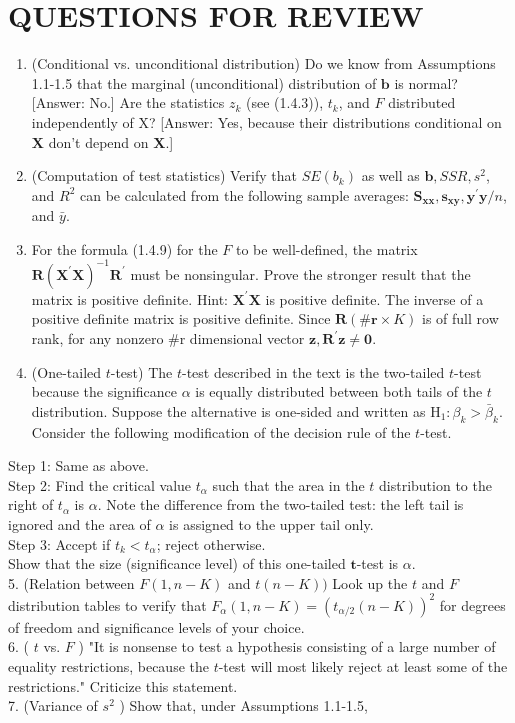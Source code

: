 \documentclass[10pt]{article}
\begin{document}
\section*{QUESTIONS FOR REVIEW}
\begin{enumerate}
  \item (Conditional vs. unconditional distribution) Do we know from Assumptions 1.1-1.5 that the marginal (unconditional) distribution of $\mathbf{b}$ is normal? [Answer: No.] Are the statistics $z_{k}$ (see (1.4.3)), $t_{k}$, and $F$ distributed independently of X? [Answer: Yes, because their distributions conditional on $\mathbf{X}$ don't depend on $\mathbf{X}$.]
  \item (Computation of test statistics) Verify that $S E\left(b_{k}\right)$ as well as $\mathbf{b}, S S R, s^{2}$, and $R^{2}$ can be calculated from the following sample averages: $\mathbf{S}_{\mathbf{x x}}, \mathbf{s}_{\mathbf{x y}}, \mathbf{y}^{\prime} \mathbf{y} / n$, and $\bar{y}$.
  \item For the formula (1.4.9) for the $F$ to be well-defined, the matrix $\mathbf{R}\left(\mathbf{X}^{\prime} \mathbf{X}\right)^{-1} \mathbf{R}^{\prime}$ must be nonsingular. Prove the stronger result that the matrix is positive definite. Hint: $\mathbf{X}^{\prime} \mathbf{X}$ is positive definite. The inverse of a positive definite matrix is positive definite. Since $\mathbf{\mathbf { R }}(\# \mathbf{r} \times K)$ is of full row rank, for any nonzero \#r dimensional vector $\mathbf{z}, \mathbf{R}^{\prime} \mathbf{z} \neq \mathbf{0}$.
  \item (One-tailed $t$-test) The $t$-test described in the text is the two-tailed $t$-test because the significance $\alpha$ is equally distributed between both tails of the $t$ distribution. Suppose the alternative is one-sided and written as $\mathrm{H}_{1}: \beta_{k}>\bar{\beta}_{k}$. Consider the following modification of the decision rule of the $t$-test.
\end{enumerate}

Step 1: Same as above.\\
Step 2: Find the critical value $t_{\alpha}$ such that the area in the $t$ distribution to the right of $t_{\alpha}$ is $\alpha$. Note the difference from the two-tailed test: the left tail is ignored and the area of $\alpha$ is assigned to the upper tail only.\\
Step 3: Accept if $t_{k}<t_{\alpha}$; reject otherwise.\\
Show that the size (significance level) of this one-tailed $\boldsymbol{t}$-test is $\alpha$.\\
5. (Relation between $F(1, n-K)$ and $t(n-K))$ Look up the $t$ and $F$ distribution tables to verify that $F_{\alpha}(1, n-K)=\left(t_{\alpha / 2}(n-K)\right)^{2}$ for degrees of freedom and significance levels of your choice.\\
6. ( $t$ vs. $F$ ) "It is nonsense to test a hypothesis consisting of a large number of equality restrictions, because the $t$-test will most likely reject at least some of the restrictions." Criticize this statement.\\
7. (Variance of $s^{2}$ ) Show that, under Assumptions 1.1-1.5,
\end{document}
